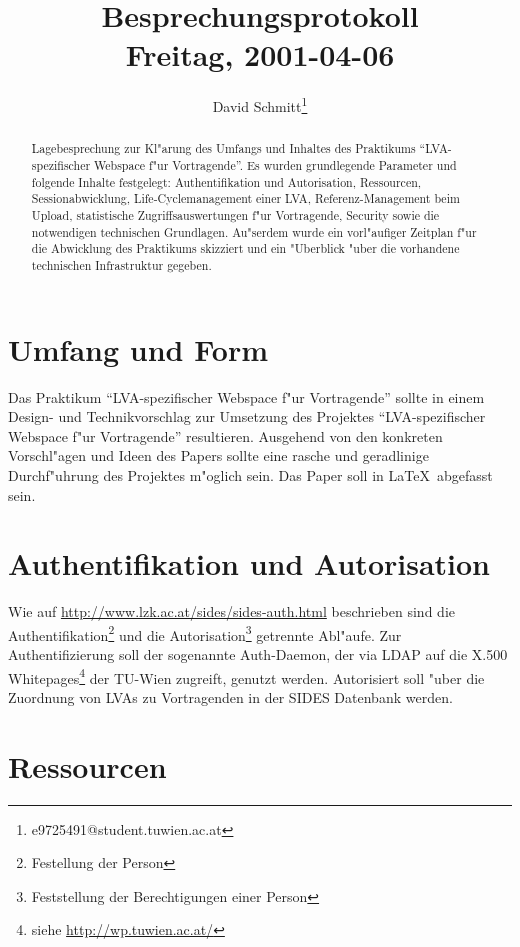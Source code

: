 \documentclass[12pt,a4paper]{article}
\title{Besprechungsprotokoll\\Freitag, 2001-04-06}
\author{David Schmitt\thanks{e9725491@student.tuwien.ac.at}}
\begin{document}
\maketitle

\vfill

\begin{abstract}

Lagebesprechung zur Kl"arung des Umfangs und Inhaltes des Praktikums
"`LVA-spezifischer Webspace f"ur Vortragende"'. Es wurden grundlegende
Parameter und folgende Inhalte festgelegt: Authentifikation und
Autorisation, Ressourcen, Sessionabwicklung, Life-Cyclemanagement einer
LVA, Referenz-Management beim Upload, statistische Zugriffsauswertungen
f"ur Vortragende, Security sowie die notwendigen technischen Grundlagen.
Au"serdem wurde ein vorl"aufiger Zeitplan f"ur die Abwicklung des
Praktikums skizziert und ein "Uberblick "uber die vorhandene technischen
Infrastruktur gegeben.

\end{abstract}

\newpage

\section{Umfang und Form}

Das Praktikum "`LVA-spezifischer Webspace f"ur Vortragende"' sollte in
einem Design- und Technikvorschlag zur Umsetzung des Projektes
"`LVA-spezifischer Webspace f"ur Vortragende"' resultieren. Ausgehend von
den konkreten Vorschl"agen und Ideen des Papers sollte eine rasche und
geradlinige Durchf"uhrung des Projektes m"oglich sein. Das Paper soll in
\LaTeX\ abgefasst sein.

\section{Authentifikation und Autorisation}

Wie auf \url{http://www.lzk.ac.at/sides/sides-auth.html} beschrieben sind
die Authentifikation\footnote{Festellung der Person} und die
Autorisation\footnote{Feststellung der Berechtigungen einer Person}
getrennte Abl"aufe. Zur Authentifizierung soll der sogenannte Auth-Daemon,
der via LDAP auf die X.500 Whitepages\footnote{siehe
\url{http://wp.tuwien.ac.at/}} der TU-Wien zugreift, genutzt werden.
Autorisiert soll "uber die Zuordnung von LVAs zu Vortragenden in der SIDES
Datenbank werden.

\section{Ressourcen}
\end{document}

